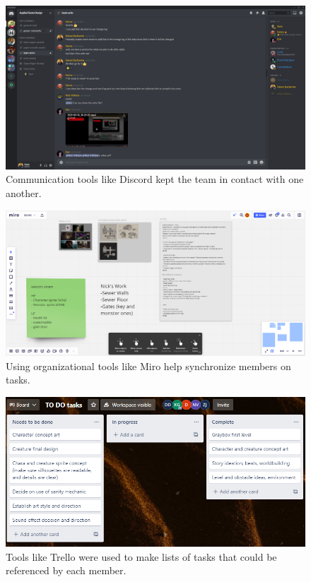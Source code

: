 \begin{figure}[h!]
    \centering
    \includegraphics[width=\linewidth]{Figures/CommunicationDiscord.PNG}
    \caption{Communication tools like Discord kept the team in contact with one another.}
\end{figure}

\begin{figure}[h!]
    \centering
    \includegraphics[width=\linewidth]{Figures/Miro.png}
    \caption{Using organizational tools like Miro help synchronize members on tasks.}
\end{figure}

\begin{figure}[h!]
    \centering
    \includegraphics[width=\linewidth]{Figures/TaskBoard.PNG}
    \caption{Tools like Trello were used to make lists of tasks that could be referenced by each member.}
\end{figure}

